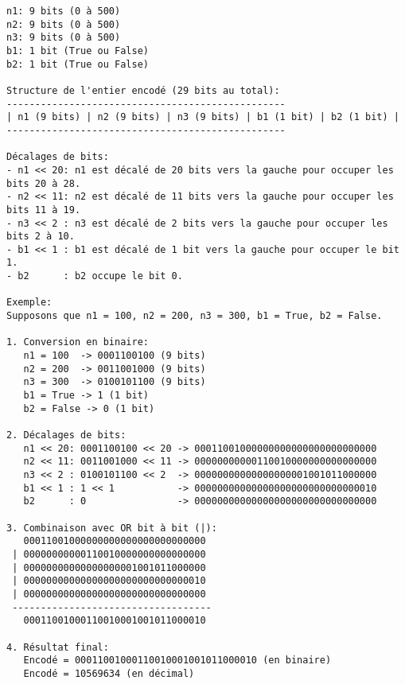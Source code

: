 \documentclass{article}
\begin{document}
\begin{lstlisting}[caption=Explication des décalages de bits]
n1: 9 bits (0 à 500)
n2: 9 bits (0 à 500)
n3: 9 bits (0 à 500)
b1: 1 bit (True ou False)
b2: 1 bit (True ou False)

Structure de l'entier encodé (29 bits au total):
-------------------------------------------------
| n1 (9 bits) | n2 (9 bits) | n3 (9 bits) | b1 (1 bit) | b2 (1 bit) |
-------------------------------------------------

Décalages de bits:
- n1 << 20: n1 est décalé de 20 bits vers la gauche pour occuper les bits 20 à 28.
- n2 << 11: n2 est décalé de 11 bits vers la gauche pour occuper les bits 11 à 19.
- n3 << 2 : n3 est décalé de 2 bits vers la gauche pour occuper les bits 2 à 10.
- b1 << 1 : b1 est décalé de 1 bit vers la gauche pour occuper le bit 1.
- b2      : b2 occupe le bit 0.

Exemple:
Supposons que n1 = 100, n2 = 200, n3 = 300, b1 = True, b2 = False.

1. Conversion en binaire:
   n1 = 100  -> 0001100100 (9 bits)
   n2 = 200  -> 0011001000 (9 bits)
   n3 = 300  -> 0100101100 (9 bits)
   b1 = True -> 1 (1 bit)
   b2 = False -> 0 (1 bit)

2. Décalages de bits:
   n1 << 20: 0001100100 << 20 -> 00011001000000000000000000000000
   n2 << 11: 0011001000 << 11 -> 00000000000110010000000000000000
   n3 << 2 : 0100101100 << 2  -> 00000000000000000001001011000000
   b1 << 1 : 1 << 1           -> 00000000000000000000000000000010
   b2      : 0                -> 00000000000000000000000000000000

3. Combinaison avec OR bit à bit (|):
   00011001000000000000000000000000
 | 00000000000110010000000000000000
 | 00000000000000000001001011000000
 | 00000000000000000000000000000010
 | 00000000000000000000000000000000
 -----------------------------------
   00011001000110010001001011000010

4. Résultat final:
   Encodé = 00011001000110010001001011000010 (en binaire)
   Encodé = 10569634 (en décimal)
\end{lstlisting}
\end{document}
